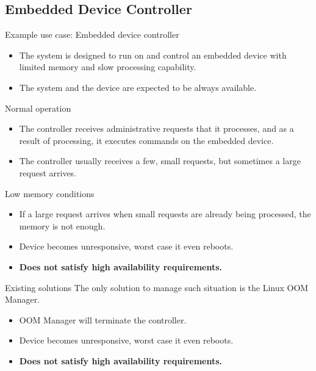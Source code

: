 \documentclass{beamer}
\begin{document}
\subsection{Embedded Device Controller}
\begin{frame}{Example use case: Embedded device controller}
\begin{itemize}
	\item The system is designed to run on and control an embedded device with limited memory and slow processing capability.
	\item The system and the device are expected to be always available.
\end{itemize}
\end{frame}

\begin{frame}{Normal operation}
\begin{itemize}
	\item The controller receives administrative requests that it processes, and as a result of processing, it executes commands on the embedded device. 
	\item The controller usually receives a few, small requests, but sometimes a large request arrives.
\end{itemize}
\end{frame}

\begin{frame}{Low memory conditions}
\begin{itemize}
	\item If a large request arrives when small requests are already being processed, the memory is not enough. 
	\item Device becomes unresponsive, worst case it even reboots.
	\item {\bfseries Does not satisfy high availability requirements.}
\end{itemize}
\end{frame}

\begin{frame}{Existing solutions}
The only solution to manage such situation is the Linux OOM Manager.
\begin{itemize}
	\item OOM Manager will terminate the controller.
	\item Device becomes unresponsive, worst case it even reboots.
	\item {\bfseries Does not satisfy high availability requirements.}
\end{itemize}
\end{frame}
\end{document}
